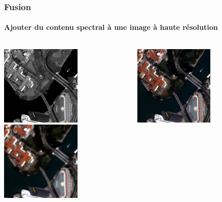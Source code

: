 \documentclass[compress,handout]{beamer}
\begin{document}
\begin{frame}
  \frametitle{Fusion}
  \framesubtitle{Ajouter du contenu spectral à une image à haute résolution}
\centering
\begin{columns}
\begin{column}{0.45\textwidth}
 \includegraphics[width=0.6\textwidth]{panSharp-pan-extract.jpg}\\
 \includegraphics[width=0.6\textwidth]{panSharp-xs-extract.jpg}
\end{column}
\begin{column}{0.45\textwidth}
 \includegraphics[width=0.6\textwidth]{panSharp-extract.jpg}
\end{column}
\end{columns}

\end{frame}
\end{document}
